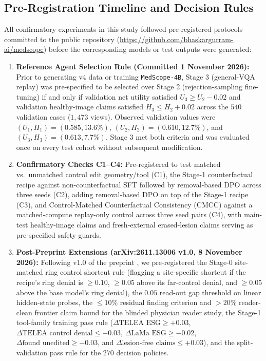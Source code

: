 \documentclass[5p,times,twocolumn,authoryear]{elsarticle}
\begin{document}
\subsection{Pre-Registration Timeline and Decision Rules}
All confirmatory experiments in this study followed pre-registered protocols committed to the public repository (\url{https://github.com/bhaskargurram-ai/medscope}) before the corresponding models or test outputs were generated:
\begin{enumerate}[leftmargin=*,nosep]
    \item \textbf{Reference Agent Selection Rule (Committed 1 November 2026):} Prior to generating v4 data or training \texttt{MedScope-4B}, Stage 3 (general-VQA replay) was pre-specified to be selected over Stage 2 (rejection-sampling fine-tuning) if and only if validation net utility satisfied $U_3 \ge U_2 - 0.02$ and validation healthy-image claims satisfied $H_3 \le H_2 + 0.02$ across the $540$ validation cases ($1,473$ views). Observed validation values were $(U_1, H_1) = (0.585, 13.6\%)$, $(U_2, H_2) = (0.610, 12.7\%)$, and $(U_3, H_3) = (0.613, 7.7\%)$. Stage 3 met both criteria and was evaluated once on every test cohort without subsequent modification.
    \item \textbf{Confirmatory Checks C1--C4:} Pre-registered to test matched vs.\ unmatched control edit geometry/tool (C1), the Stage-1 counterfactual recipe against non-counterfactual SFT followed by removal-based DPO across three seeds (C2), adding removal-based DPO on top of the Stage-1 recipe (C3), and Control-Matched Counterfactual Consistency (CMCC) against a matched-compute replay-only control across three seed pairs (C4), with main-test healthy-image claims and fresh-external erased-lesion claims serving as pre-specified safety guards.
    \item \textbf{Post-Preprint Extensions (arXiv:2611.13006 v1.0, 8 November 2026):} Following v1.0 of the preprint \citep{gurram2026medscope}, we pre-registered the Stage-0 site-matched ring control shortcut rule (flagging a site-specific shortcut if the recipe's ring denial is $\ge 0.10$, $\ge 0.05$ above its far-control denial, and $\ge 0.05$ above the base model's ring denial), the $0.05$ read-out gap threshold on linear hidden-state probes, the $\le 10\%$ residual finding criterion and $>20\%$ reader-clean frontier claim bound for the blinded physician reader study, the Stage-1 tool-family training pass rule ($\Delta\text{TELEA ESG} \ge +0.03$, $\Delta\text{TELEA control denial} \le -0.03$, $\Delta\text{LaMa ESG} \ge -0.02$, $\Delta\text{found unedited} \ge -0.03$, and $\Delta\text{lesion-free claims} \le +0.03$), and the split-validation pass rule for the $270$ decision policies.
\end{enumerate}
\end{document}
